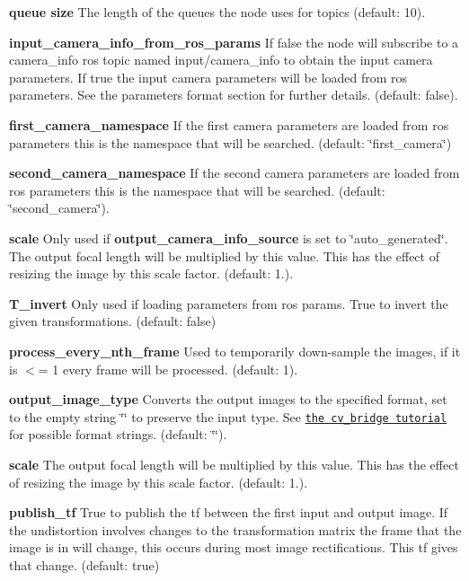 \begin{DoxyItemize}
\item {\bfseries queue size} The length of the queues the node uses for topics (default\+: 10).
\item {\bfseries input\+\_\+camera\+\_\+info\+\_\+from\+\_\+ros\+\_\+params} If false the node will subscribe to a camera\+\_\+info ros topic named input/camera\+\_\+info to obtain the input camera parameters. If true the input camera parameters will be loaded from ros parameters. See the parameters format section for further details. (default\+: false).
\item {\bfseries first\+\_\+camera\+\_\+namespace} If the first camera parameters are loaded from ros parameters this is the namespace that will be searched. (default\+: \char`\"{}first\+\_\+camera\char`\"{})
\item {\bfseries second\+\_\+camera\+\_\+namespace} If the second camera parameters are loaded from ros parameters this is the namespace that will be searched. (default\+: \char`\"{}second\+\_\+camera\char`\"{}).
\item {\bfseries scale} Only used if {\bfseries output\+\_\+camera\+\_\+info\+\_\+source} is set to \char`\"{}auto\+\_\+generated\char`\"{}. The output focal length will be multiplied by this value. This has the effect of resizing the image by this scale factor. (default\+: 1.).
\item {\bfseries T\+\_\+invert} Only used if loading parameters from ros params. True to invert the given transformations. (default\+: false)
\item {\bfseries process\+\_\+every\+\_\+nth\+\_\+frame} Used to temporarily down-\/sample the images, if it is $<$= 1 every frame will be processed. (default\+: 1).
\item {\bfseries output\+\_\+image\+\_\+type} Converts the output images to the specified format, set to the empty string \char`\"{}\char`\"{} to preserve the input type. See \href{http://wiki.ros.org/cv_bridge/Tutorials/UsingCvBridgeToConvertBetweenROSImagesAndOpenCVImages}{\tt the cv\+\_\+bridge tutorial} for possible format strings. (default\+: \char`\"{}\char`\"{}).
\item {\bfseries scale} The output focal length will be multiplied by this value. This has the effect of resizing the image by this scale factor. (default\+: 1.).
\item {\bfseries publish\+\_\+tf} True to publish the tf between the first input and output image. If the undistortion involves changes to the transformation matrix the frame that the image is in will change, this occurs during most image rectifications. This tf gives that change. (default\+: true)

\end{DoxyItemize}
